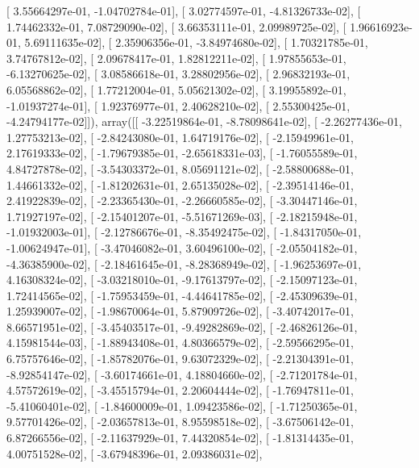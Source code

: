 \documentclass{article}
\begin{document}
       [  3.55664297e-01,  -1.04702784e-01],
       [  3.02774597e-01,  -4.81326733e-02],
       [  1.74462332e-01,   7.08729090e-02],
       [  3.66353111e-01,   2.09989725e-02],
       [  1.96616923e-01,   5.69111635e-02],
       [  2.35906356e-01,  -3.84974680e-02],
       [  1.70321785e-01,   3.74767812e-02],
       [  2.09678417e-01,   1.82812211e-02],
       [  1.97855653e-01,  -6.13270625e-02],
       [  3.08586618e-01,   3.28802956e-02],
       [  2.96832193e-01,   6.05568862e-02],
       [  1.77212004e-01,   5.05621302e-02],
       [  3.19955892e-01,  -1.01937274e-01],
       [  1.92376977e-01,   2.40628210e-02],
       [  2.55300425e-01,  -4.24794177e-02]]), array([[ -3.22519864e-01,  -8.78098641e-02],
       [ -2.26277436e-01,   1.27753213e-02],
       [ -2.84243080e-01,   1.64719176e-02],
       [ -2.15949961e-01,   2.17619333e-02],
       [ -1.79679385e-01,  -2.65618331e-03],
       [ -1.76055589e-01,   4.84727878e-02],
       [ -3.54303372e-01,   8.05691121e-02],
       [ -2.58800688e-01,   1.44661332e-02],
       [ -1.81202631e-01,   2.65135028e-02],
       [ -2.39514146e-01,   2.41922839e-02],
       [ -2.23365430e-01,  -2.26660585e-02],
       [ -3.30447146e-01,   1.71927197e-02],
       [ -2.15401207e-01,  -5.51671269e-03],
       [ -2.18215948e-01,  -1.01932003e-01],
       [ -2.12786676e-01,  -8.35492475e-02],
       [ -1.84317050e-01,  -1.00624947e-01],
       [ -3.47046082e-01,   3.60496100e-02],
       [ -2.05504182e-01,  -4.36385900e-02],
       [ -2.18461645e-01,  -8.28368949e-02],
       [ -1.96253697e-01,   4.16308324e-02],
       [ -3.03218010e-01,  -9.17613797e-02],
       [ -2.15097123e-01,   1.72414565e-02],
       [ -1.75953459e-01,  -4.44641785e-02],
       [ -2.45309639e-01,   1.25939007e-02],
       [ -1.98670064e-01,   5.87909726e-02],
       [ -3.40742017e-01,   8.66571951e-02],
       [ -3.45403517e-01,  -9.49282869e-02],
       [ -2.46826126e-01,   4.15981544e-03],
       [ -1.88943408e-01,   4.80366579e-02],
       [ -2.59566295e-01,   6.75757646e-02],
       [ -1.85782076e-01,   9.63072329e-02],
       [ -2.21304391e-01,  -8.92854147e-02],
       [ -3.60174661e-01,   4.18804660e-02],
       [ -2.71201784e-01,   4.57572619e-02],
       [ -3.45515794e-01,   2.20604444e-02],
       [ -1.76947811e-01,  -5.41060401e-02],
       [ -1.84600009e-01,   1.09423586e-02],
       [ -1.71250365e-01,   9.57701426e-02],
       [ -2.03657813e-01,   8.95598518e-02],
       [ -3.67506142e-01,   6.87266556e-02],
       [ -2.11637929e-01,   7.44320854e-02],
       [ -1.81314435e-01,   4.00751528e-02],
       [ -3.67948396e-01,   2.09386031e-02],
\end{document}

